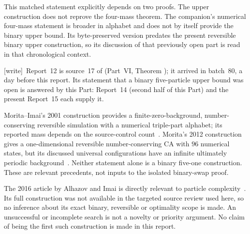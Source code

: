 \documentclass[11pt,a4paper]{article}
\numberwithin{equation}{section}
\newcommand{\wtag}{\textup{[write]}}
\begin{document}
This matched statement explicitly depends on two proofs. The upper construction
does not reprove the four-mass theorem. The companion's numerical four-mass
statement is broader in alphabet and does not by itself provide the binary
upper bound. Its byte-preserved version predates the present reversible binary
upper construction, so its discussion of that previously open part is read
in that chronological context.

\wtag\ Report~12 is source~17 of  (Part~VI, Theorem ); it arrived in batch~80, a day before this report. Its statement that a binary five-particle upper bound was open is answered by this Part: Report~14 (second half of this Part) and the present Report~15 each supply it.

Morita--Imai's 2001 construction provides a finite-zero-background,
number-conserving reversible simulation with a numerical triple-part alphabet;
its reported mass depends on the source-control count~\cite{fpa:moritaimai2001}.
Morita's 2012 construction gives a one-dimensional reversible
number-conserving CA with $96$ numerical states, but its discussed universal
configurations have an infinite ultimately periodic background~\cite{fpa:morita2012}.
Neither statement alone is a binary five-one construction. These are relevant
precedents, not inputs to the isolated binary-swap proof.

The 2016 article by Alhazov and Imai is directly relevant to particle
complexity~\cite{fpa:alhazovimai}. Its full construction was not available in
the targeted source review used here, so no inference about its exact binary,
reversible or optimality scope is made. An unsuccessful or incomplete search
is not a novelty or priority argument. No claim of being the first such
construction is made in this report.
\end{document}
